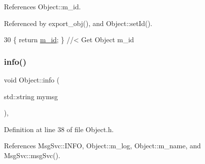 References Object\+::m\+\_\+id.



Referenced by export\+\_\+obj(), and Object\+::set\+Id().


\begin{DoxyCode}
30 \{ \textcolor{keywordflow}{return} \hyperlink{classObject_aca74b9dbfed7b5556ea2d56c65b6b6b0}{m\_id};         \} \textcolor{comment}{//< Get Object m\_id }
\end{DoxyCode}
\mbox{\label{classObject_a644fd329ea4cb85f54fa6846484b84a8}} 
\subsubsection{\texorpdfstring{info()}{info()}\hspace{0.1cm}{\footnotesize\ttfamily [1/2]}}
{\footnotesize\ttfamily void Object\+::info (\begin{DoxyParamCaption}\item[{std\+::string}]{mymsg }\end{DoxyParamCaption})\hspace{0.3cm}{\ttfamily [inline]}, {\ttfamily [inherited]}}



Definition at line 38 of file Object.\+h.



References Msg\+Svc\+::\+I\+N\+FO, Object\+::m\+\_\+log, Object\+::m\+\_\+name, and Msg\+Svc\+::msg\+Svc().



